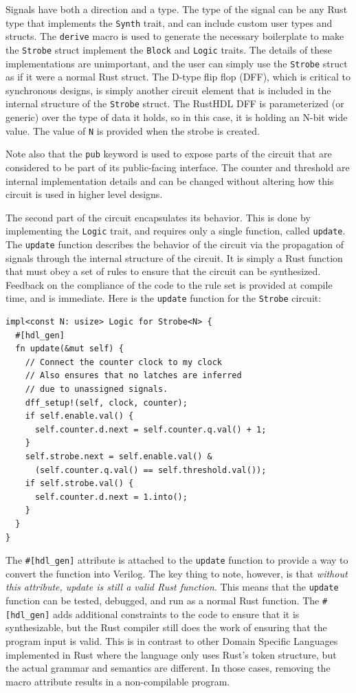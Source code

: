 \documentclass[conference]{IEEEtran}
\begin{document}
Signals have both a direction and a type.  The type of the
signal can be any Rust type that implements the \verb|Synth| trait, and can include custom user
types and structs.  The \verb|derive| macro is used to generate the necessary boilerplate to make the 
\verb|Strobe| struct implement the \verb|Block| and \verb|Logic| traits.  The details of these implementations are
unimportant, and the user can simply use the \verb|Strobe| struct as if it were a normal Rust struct. 
The D-type flip flop (DFF), which is critical to synchronous designs, is simply another circuit element that
is included in the internal structure of the \verb|Strobe| struct.  The RustHDL DFF is parameterized (or 
generic) over the type of data it holds, so in this case, it is holding an N-bit wide value.  The value of
\verb|N| is provided when the strobe is created.

Note also that the \verb|pub| keyword is used to expose parts of the circuit that are considered to be part
of its public-facing interface.   The counter and threshold are internal implementation details and can be
changed without altering how this circuit is used in higher level designs.

The second part of the circuit encapsulates its behavior.  This is done by implementing the \verb|Logic| trait,
and requires only a single function, called \verb|update|.  The \verb|update| function describes the behavior
of the circuit via the propagation of signals through the internal structure of the circuit.  It is simply a Rust function
that must obey a set of rules to ensure that the circuit can be synthesized.  Feedback on the compliance of the
code to the rule set is provided at compile time, and is immediate.  Here is the \verb|update| function for
the \verb|Strobe| circuit:

\begin{verbatim}
impl<const N: usize> Logic for Strobe<N> {
  #[hdl_gen]
  fn update(&mut self) {
    // Connect the counter clock to my clock
    // Also ensures that no latches are inferred
    // due to unassigned signals.
    dff_setup!(self, clock, counter);
    if self.enable.val() {
      self.counter.d.next = self.counter.q.val() + 1;
    }
    self.strobe.next = self.enable.val() & 
      (self.counter.q.val() == self.threshold.val());
    if self.strobe.val() {
      self.counter.d.next = 1.into();
    }
  }
}
\end{verbatim}

The \verb|#[hdl_gen]| attribute is attached to the \verb|update| function to provide a way to convert the function
into Verilog.  The key thing to note, however, is that \emph{without this attribute, update is still a valid Rust function}.
This means that the \verb|update| function can be tested, debugged, and run as a normal Rust function.  The \verb|#[hdl_gen]| adds
additional constraints to the code to ensure that it is synthesizable, but the Rust compiler still does the work of ensuring that the 
program input is valid.  This is in contrast to other Domain Specific Languages implemented in Rust where the 
language only uses Rust's token structure, but the actual grammar and semantics are different.  In those cases, removing the 
macro attribute results in a non-compilable program.
\end{document}
